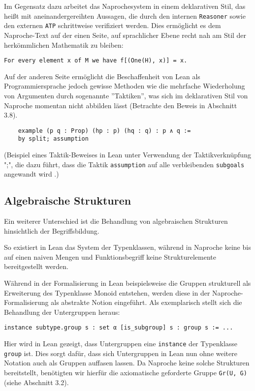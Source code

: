 \documentclass[a4paper,12pt]{scrartcl}
\newcommand{\ls}[1]{\lstinline|#1|}
\begin{document}
Im Gegensatz dazu arbeitet das Naprochesystem in einem deklarativen Stil, das heißt mit aneinandergereihten Aussagen, die durch den internen \verb!Reasoner! sowie den externen \verb!ATP! schrittweise verifiziert werden. Dies ermöglicht es dem Naproche-Text auf der einen Seite, auf sprachlicher Ebene recht nah am Stil der herkömmlichen Mathematik zu bleiben:

\lstset{language=ftl}
\begin{lstlisting}
For every element x of M we have f[(One(H), x)] = x.
\end{lstlisting}

Auf der anderen Seite ermöglicht die Beschaffenheit von Lean als Programmiersprache jedoch gewisse Methoden wie die mehrfache Wiederholung von Argumenten durch sogenannte ''Taktiken'', was sich im deklarativen Stil von Naproche momentan nicht abbilden lässt (Betrachte den Beweis in Abschnitt 3.8).

\lstset{language=lean}
\begin{lstlisting}
    example (p q : Prop) (hp : p) (hq : q) : p ∧ q :=
    by split; assumption
\end{lstlisting}

(Beispiel eines Taktik-Beweises in Lean unter Verwendung der Taktikverknüpfung ";", die dazu führt, dass die Taktik \lstinline{assumption} auf alle verbleibenden \lstinline{subgoals} angewandt wird \cite{bibtex.e}.)

\subsection{Algebraische Strukturen}

Ein weiterer Unterschied ist die Behandlung von algebraischen Strukturen hinsichtlich der Begriffsbildung.

So existiert in Lean das System der Typenklassen, während in Naproche keine bis auf einen naiven Mengen und Funktionsbegriff keine Strukturelemente bereitgestellt werden.

Während in der Formalisierung in Lean beispielsweise die Gruppen strukturell als Erweiterung des Typenklasse Monoid entstehen, werden diese in der Naproche-Formalisierung als abstrakte Notion eingeführt. Als exemplarisch stellt sich die Behandlung der Untergruppen heraus:
\begin{lstlisting}
instance subtype.group s : set α [is_subgroup] s : group s := ...
\end{lstlisting}
Hier wird in Lean gezeigt, dass Untergruppen eine \ls{instance} der Typenklasse \ls{group} ist. Dies sorgt dafür, dass sich Untergruppen in Lean nun ohne weitere Notation auch als Gruppen auffasen lassen.
Da Naproche keine solche Strukturen bereitstellt, benötigten wir hierfür die axiomatische geforderte Gruppe \verb!Gr(U, G)! (siehe Abschnitt 3.2).
\end{document}
